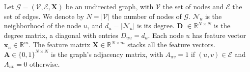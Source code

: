 Let $\mathcal{G} = (\mathcal{V}, \mathcal{E}, \mathbf{X})$ be an undirected graph, with $\mathcal{V}$ the set of nodes and $\mathcal{E} $ the set of edges. We denote by $N = |\mathcal{V}| $  the number of nodes of   $\mathcal{G}$.  
$\mathcal{N}_u$ is the neighborhood of the node $u$, and $d_u = |\mathcal{N}_u|$ is its degree.
$\mathbf{D}$ $\in \mathbb{R}^{N \times N}$ is the degree matrix, a diagonal with  entries 
$D_{u u} = d_u$. Each node $u$ has feature vector
$\mathbf{x}_u \in \mathbb{R}^m$. The  feature
matrix  $\mathbf{X} \in \mathbb{R}^{N \times m} $ stacks all the feature vectors. $\mathbf{A} \in \{0, 1\}^{N \times N}$ is the graph's adjacency matrix, with $A_{uv} = 1$ if $(u, v) \in \mathcal{E}$  and $A_{uv} = 0$ otherwise.

